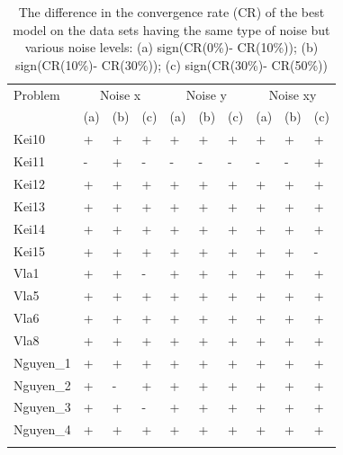 \begin{table}
\caption{The difference in the convergence rate (CR) of the best model on the data sets having the same type of noise but various noise levels: (a) sign(CR(0\%)- CR(10\%)); (b) sign(CR(10\%)- CR(30\%)); (c) sign(CR(30\%)- CR(50\%)) }
\label{tab:difCR1}       %
\begin{tabular}{l|lll|lll|lll}
\hline\noalign{\smallskip}
Problem & \multicolumn{3}{c|}{Noise x} & \multicolumn{3}{c|}{Noise y} & \multicolumn{3}{c}{Noise xy} \\
 & (a) & (b) & (c) & (a) & (b) & (c) & (a) & (b) & (c) \\
\noalign{\smallskip}\hline\noalign{\smallskip}
Kei10 & + & + & + & + & + & + & + & + & + \\
Kei11 & - & + & - & - & - & - & - & - & + \\
Kei12 & + & + & + & + & + & + & + & + & + \\
Kei13 & + & + & + & + & + & + & + & + & + \\
Kei14 & + & + & + & + & + & + & + & + & + \\
Kei15 & + & + & + & + & + & + & + & + & - \\
Vla1 & + & + & - & + & + & + & + & + & + \\
Vla5 & + & + & + & + & + & + & + & + & + \\
Vla6 & + & + & + & + & + & + & + & + & + \\
Vla8 & + & + & + & + & + & + & + & + & + \\
Nguyen\_1 & + & + & + & + & + & + & + & + & + \\
Nguyen\_2 & + & - & + & + & + & + & + & + & + \\
Nguyen\_3 & + & + & - & + & + & + & + & + & + \\
Nguyen\_4 & + & + & + & + & + & + & + & + & + \\
\noalign{\smallskip}\hline
\end{tabular}
\end{table}


